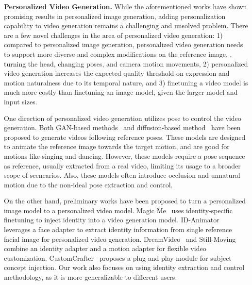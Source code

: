 \textbf{Personalized Video Generation.}
While the aforementioned works have shown promising results in personalized image generation, adding personalization capability to video generation remains a challenging and unsolved problem. There are a few novel challenges in the area of personalized video generation: 1) compared to personalized image generation, personalized video generation needs to support more diverse and complex modifications on the reference image, \eg, turning the head, changing poses, and camera motion movements,
2) personalized video generation increases the expected quality threshold on expression and motion naturalness due to its temporal nature, and 3) finetuning a video model is much more costly than finetuning an image model, given the larger model and input sizes.

One direction of personalized video generation utilizes pose to control the video generation. Both GAN-based methods~\citep{chan2019everybody, yoon2021pose} and diffusion-based method~\citep{wang2024disco, wang2024disco, hu2024animate, xu2024magicanimate} have been proposed to generate videos following reference poses. These models are designed to animate the reference image towards the target motion, and are good for motions like singing and dancing. However, these models
require a pose sequence as reference, usually extracted from a real video, limiting its usage to a broader scope of scenearios. Also, these models often introduce occlusion and unnatural motion due to the non-ideal pose extraction and control.

On the other hand, preliminary works have been proposed to turn a personalized image model to a personalized video model. Magic Me~\citep{ma2024magic} uses identity-specific finetuning to inject identity into a video generation model. ID-Animator~\citep{he2024id} leverages a face adapter to extract identity information from single reference facial image for personalized video generation. DreamVideo~\citep{wei2024dreamvideo} and Still-Moving~\citep{chefer2024still} combine an identity adapter and a motion adapter for flexible video customization. CustomCrafter~\citep{wu2024customcrafter} proposes a
plug-and-play module for subject concept injection. Our work also focuses on using identity extraction and control methodology, as it is more generalizable to different users.
